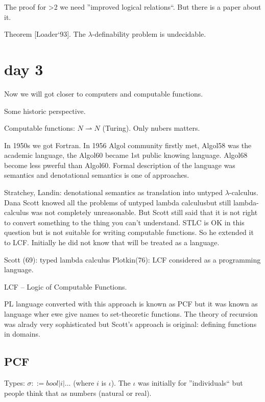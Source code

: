 \documentclass[a4paper,10pt]{book}
\begin{document}
The proof for >2 we need ''improved logical relations``. But there is a paper about it.

Theorem [Loader`93]. The $\lambda$-definability problem is undecidable.

\section{day 3}

Now we will got closer to computers and computable functions.

Some historic perspective.

Computable functions: $N \rightharpoonup N$ (Turing). Only nubers matters.

In 1950s we got Fortran. In 1956 Algol community firstly met, Algol58 was the academic language,
the Algol60 became 1st public knowing language. Algol68 become less pwerful than Algol60.
Formal description of the language was semantics and denotational semantics is one of approaches.

Stratchey, Landin: denotational semantics  as translation into untyped $\lambda$-calculus.
Dana Scott knowed all the problems of untyped lambda calculusbut still lambda-calculus was not 
completely unreasonable. But Scott still said that it is not right to convert something to the 
thing you can't understand. STLC is OK in this question but is not suitable for writing computable 
functions. So he extended it to LCF. Initially he did not know that will be treated as a language.

Scott (69): typed lambda calculus
Plotkin(76): LCF considered as a programming language.

LCF -- Logic of Computable Functions.

PL language converted with this approach is known as PCF but it was known as language wher ewe give 
names to set-theoretic functions. The theory of recursion was alrady very sophisticated but
Scott's approach is original: defining functions in domains.


\subsection{PCF}

Types: $\sigma ::= bool | i  | ...$ (where $i$ is $\iota$). The $\iota$ was initially for ''individuals``
but people think that as numbers (natural or real).
\end{document}
